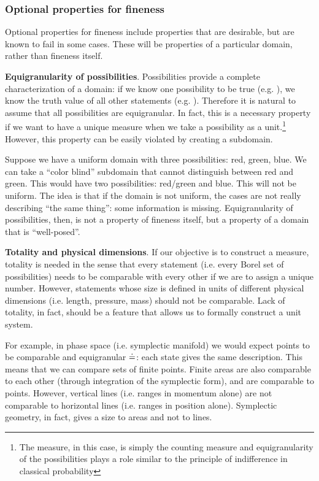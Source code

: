 \documentclass[11pt]{article}
\begin{document}
\subsubsection{Optional properties for fineness}

Optional properties for fineness include properties that are desirable, but are known to fail in some cases. These will be properties of a particular domain, rather than fineness itself.

\textbf{Equigranularity of possibilities}. Possibilities provide a complete characterization of a domain: if we know one possibility to be true (e.g. ), we know the truth value of all other statements (e.g. ). Therefore it is natural to assume that all possibilities are equigranular. In fact, this is a necessary property if we want to have a unique measure when we take a possibility as a unit.\footnote{The measure, in this case, is simply the counting measure and equigranularity of the possibilities plays a role similar to the principle of indifference in classical probability} However, this property can be easily violated by creating a subdomain.

Suppose we have a uniform domain with three possibilities: red, green, blue. We can take a ``color blind'' subdomain that cannot distinguish between red and green. This would have two possibilities: red/green and blue. This will not be uniform. The idea is that if the domain is not uniform, the cases are not really describing ``the same thing'': some information is missing. Equigranularity of possibilities, then, is not a property of fineness itself, but a property of a domain that is ``well-posed''.

\textbf{Totality and physical dimensions}. If our objective is to construct a measure, totality is needed in the sense that every statement (i.e. every Borel set of possibilities) needs to be comparable with every other if we are to assign a unique number. However, statements whose size is defined in units of different physical dimensions (i.e. length, pressure, mass) should not be comparable. Lack of totality, in fact, should be a feature that allows us to formally construct a unit system.

For example, in phase space (i.e. symplectic manifold) we would expect points to be comparable and equigranular $\doteq$: each state gives the same description. This means that we can compare sets of finite points. Finite areas are also comparable to each other (through integration of the symplectic form), and are comparable to points. However, vertical lines (i.e. ranges in momentum alone) are not comparable to horizontal lines (i.e. ranges in position alone). Symplectic geometry, in fact, gives a size to areas and not to lines.
\end{document}
